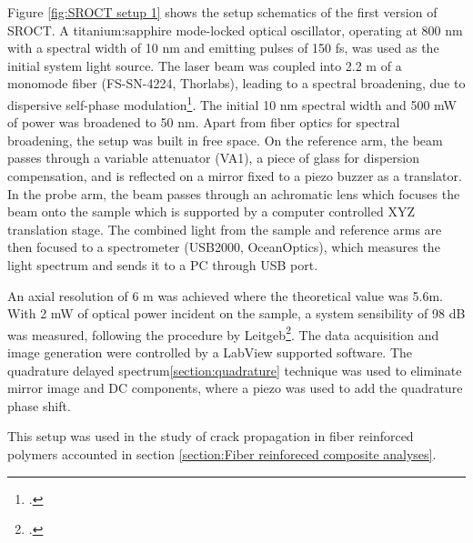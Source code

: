\documentclass[12pt,twoside,english]{book}
\renewcommand{\~}{\perispomeni}%
\DeclareRobustCommand{\textgreek}[1]{\leavevmode{\greektext #1}}
\numberwithin{equation}{section}
\numberwithin{figure}{section}
\begin{document}
Figure \ref{fig:SROCT setup 1} shows the setup schematics of the first version of \gls{SROCT}. A titanium:sapphire mode-locked optical oscillator, operating at 800 nm with a spectral width of 10 nm and emitting pulses of 150 fs, was used as the initial system light source. The laser beam was coupled into 2.2 m of a monomode fiber (FS-SN-4224, Thorlabs), leading to a spectral broadening, due to dispersive self-phase modulation\footcite{Hsu:2002p2439}. The initial 10 nm spectral width and 500 mW of power was broadened to 50 nm. Apart from fiber optics for spectral broadening, the setup was built in free space. On the reference arm, the beam passes through a variable attenuator (VA1), a piece of glass for dispersion compensation, and is reflected on a mirror fixed to a piezo buzzer as a translator. In the probe arm, the beam passes through an achromatic lens which focuses the beam onto the sample which is supported by a computer controlled XYZ translation stage. The combined light from the sample and reference arms are then focused to a spectrometer (USB2000, OceanOptics), which measures the light spectrum and sends it to a PC through USB port.

An axial resolution of 6 \textgreek{m}m was achieved where the theoretical value was 5.6\textgreek{m}m. With 2 mW of optical power incident on the sample, a system sensibility of 98 dB was measured, following the procedure by Leitgeb\footcite{Leitgeb:2003p1678}. The data acquisition and image generation were controlled by a LabView supported software. The quadrature delayed spectrum\ref{section:quadrature} technique was used to eliminate mirror image and DC components, where a piezo was used to add the quadrature phase shift. 

This setup was used in the study of crack propagation in fiber reinforced polymers accounted in section \ref{section:Fiber reinforeced composite analyses}.

\end{document}
